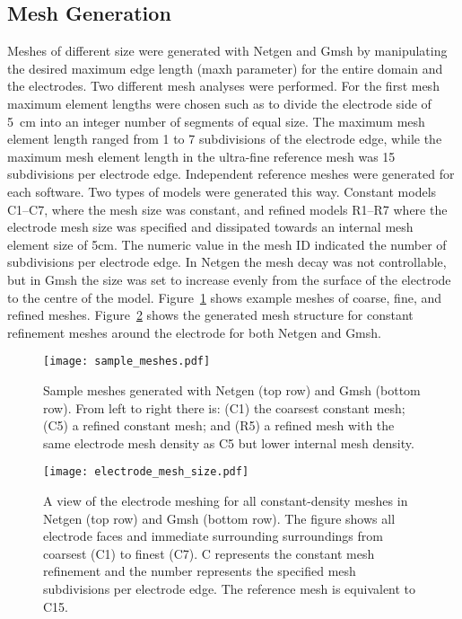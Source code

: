 \documentclass[12pt]{iopart}
\begin{document}
\subsection{Mesh Generation}
Meshes of different size were generated with Netgen and Gmsh by manipulating the desired
maximum edge length (maxh parameter) for the entire domain and the electrodes.
Two different mesh analyses were performed. For the first
mesh maximum element lengths were
chosen such as to divide the electrode side of 5~cm into an integer number of
segments of equal size. 
The maximum mesh element length ranged from 1 to 7 subdivisions of the electrode 
edge, while the maximum mesh element length in the ultra-fine reference mesh  
was 15 subdivisions per 
electrode edge. Independent reference meshes were generated for each software.
Two types of models were generated this way. Constant models C1--C7, where the mesh size 
was constant, and refined models R1--R7 where the electrode mesh size was specified and 
dissipated towards an internal mesh element size of 5cm. The numeric value in the mesh 
ID indicated the number of subdivisions per electrode edge. 
In Netgen the mesh decay was not controllable, but in Gmsh the size was set 
to increase evenly from the surface of the electrode to the centre of the model.
Figure~\ref{fig:sample_meshes} shows example meshes of coarse, fine, and refined
meshes. Figure~\ref{fig:electrode_mesh_size} shows the generated mesh structure for 
constant refinement meshes around the electrode 
for both Netgen and Gmsh. 

\begin{figure}
   \texttt{[image: sample\_meshes.pdf]}
   \caption{\label{fig:sample_meshes} Sample meshes generated with Netgen (top row)
   and Gmsh (bottom row). From left to right there is: (C1) the coarsest constant
   mesh; (C5) a refined constant mesh; and (R5) a refined mesh with the same
   electrode mesh density as C5 but lower internal mesh density.}
\end{figure}

\begin{figure}
  \texttt{[image: electrode\_mesh\_size.pdf]}
  \caption{\label{fig:electrode_mesh_size} A view of the electrode meshing for all constant-density meshes 
  in Netgen (top row) and Gmsh (bottom row). The figure shows all electrode faces and immediate surrounding
  surroundings from coarsest (C1) to finest (C7). C represents the constant mesh refinement and the number
  represents the specified mesh subdivisions per electrode edge. The reference mesh is equivalent to C15.}
\end{figure}
\end{document}
